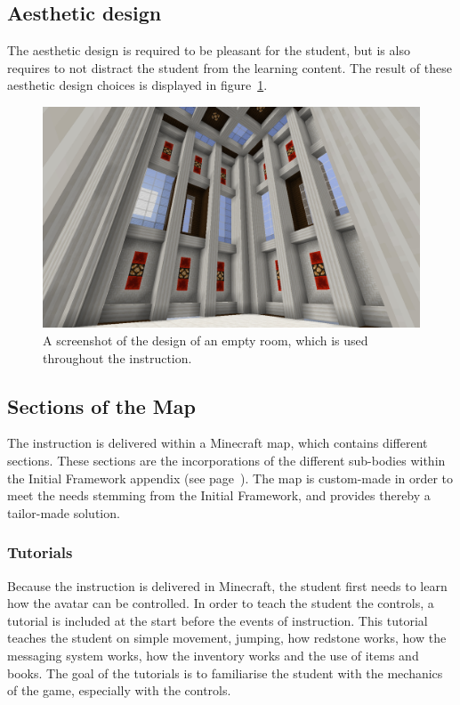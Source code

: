 \documentclass[11pt,twoside]{report} %
\begin{document}
\subsection{Aesthetic design}

The aesthetic design is required to be pleasant for the student, but is also requires to not distract the student from the learning content. The result of these aesthetic design choices is displayed in figure~\ref{fig:roomdesign}.

\begin{figure}[h]
\centering
\includegraphics[width=\textwidth]{roomdesign}
\caption{A screenshot of the design of an empty room, which is used throughout the instruction.\label{fig:roomdesign}}
\end{figure}

\subsection{Sections of the Map}

The instruction is delivered within a Minecraft map, which contains different sections. These sections are the incorporations of the different sub-bodies within the Initial Framework appendix (see page~\pageref{framework1}). The map is custom-made in order to meet the needs stemming from the Initial Framework, and provides thereby a tailor-made solution.

\subsubsection{Tutorials}

Because the instruction is delivered in Minecraft, the student first needs to learn how the avatar can be controlled. In order to teach the student the controls, a tutorial is included at the start before the events of instruction. This tutorial teaches the student on simple movement, jumping, how redstone works, how the messaging system works, how the inventory works and the use of items and books. The goal of the tutorials is to familiarise the student with the mechanics of the game, especially with the controls.
\end{document}
